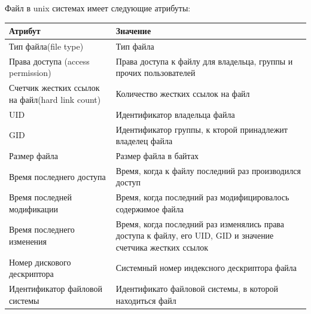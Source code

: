 \documentclass[a4paper]{article}
\begin{document}
Файл в unix системах имеет следующие атрибуты:\\
\begin{center}
  \begin{tabular}{|p{5cm}|p{10cm}|}
    \hline
    Атрибут & Значение\\
    \hline
    Тип файла(file type) & Тип файла\\
    \hline
    Права доступа (access permission) & Права доступа к файлу для владельца, группы и прочих пользователей\\
    \hline
    Счетчик жестких ссылок на файл(hard link count) &  Количество жестких ссылок на файл\\
    \hline
    UID & Идентификатор владельца файла \\
    \hline
    GID & Идентификатор группы, к кторой принадлежит владелец файла \\
    \hline
    Размер файла & Размер файла в байтах\\
    \hline
    Время последнего доступа & Время, когда к файлу последний раз производился доступ \\
    \hline
    Время последней модификации & Время, когда последний раз модифицировалось содержимое файла \\
    \hline
    Время последнего изменения & Время, когда последний раз изменялись права доступа к файлу, его UID, GID и значение счетчика жестких ссылок \\
    \hline
    Номер дискового дескриптора & Системный номер индексного дескриптора файла\\
    \hline
    Идентификатор файловой системы & Идентификато файловой системы, в которой находиться файл\\
    \hline
  \end{tabular}
\end{center}
\end{document}
